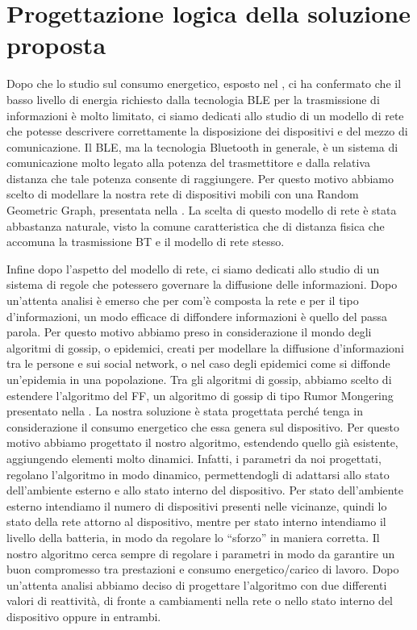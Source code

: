 \chapter{Progettazione logica della soluzione proposta}
\label{chap:Prog_log_sol}

Dopo che lo studio sul consumo energetico, esposto nel , ci ha confermato che il basso livello di energia richiesto dalla tecnologia BLE per la trasmissione di informazioni è molto limitato, ci siamo dedicati allo studio di un modello di rete che potesse descrivere correttamente la disposizione dei dispositivi e del mezzo di comunicazione. Il BLE, ma la tecnologia Bluetooth in generale, è un sistema di comunicazione molto legato alla potenza del trasmettitore e dalla relativa distanza che tale potenza consente di raggiungere. Per questo motivo abbiamo scelto di modellare la nostra rete di dispositivi mobili con una Random Geometric Graph, presentata nella . La scelta di questo modello di rete è stata abbastanza naturale, visto la comune caratteristica che di distanza fisica che accomuna la trasmissione \acs{BT} e il modello di rete stesso.

Infine dopo l'aspetto del modello di rete, ci siamo dedicati allo studio di un sistema di regole che potessero governare la diffusione delle informazioni. Dopo un'attenta analisi è emerso che per com'è composta la rete e per il tipo d'informazioni, un modo efficace di diffondere informazioni è quello del passa parola. Per questo motivo abbiamo preso in considerazione il mondo degli algoritmi di gossip, o epidemici, creati per modellare la diffusione d'informazioni tra le persone e sui social network, o nel caso degli epidemici come si diffonde un'epidemia in una popolazione. Tra gli algoritmi di gossip, abbiamo scelto di estendere l'algoritmo del \acl{FF}, un algoritmo di gossip di tipo Rumor Mongering presentato nella . La nostra soluzione è stata progettata perché tenga in considerazione il consumo energetico che essa genera sul dispositivo. Per questo motivo abbiamo progettato il nostro algoritmo, estendendo quello già esistente, aggiungendo elementi molto dinamici. Infatti, i parametri da noi progettati, regolano l'algoritmo in modo dinamico, permettendogli di adattarsi allo stato dell'ambiente esterno e allo stato interno del dispositivo. Per stato dell'ambiente esterno intendiamo il numero di dispositivi presenti nelle vicinanze, quindi lo stato della rete attorno al dispositivo, mentre per stato interno intendiamo il livello della batteria, in modo da regolare lo “sforzo” in maniera corretta. Il nostro algoritmo cerca sempre di regolare i parametri in modo da garantire un buon compromesso tra prestazioni e consumo energetico/carico di lavoro. Dopo un'attenta analisi abbiamo deciso di progettare l'algoritmo con due differenti valori di reattività, di fronte a cambiamenti nella rete o nello stato interno del dispositivo oppure in entrambi.
\bigskip

